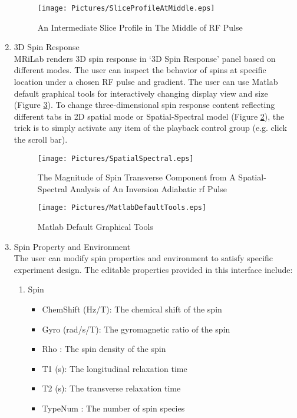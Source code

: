 \documentclass{book}%
\begin{document}
\begin{enumerate}
\begin{figure}[htbp]
	\centering
		\texttt{[image: Pictures/SliceProfileAtMiddle.eps]}
	\caption{An Intermediate Slice Profile in The Middle of RF Pulse}
	\label{fig:SliceProfileAtMiddle}
\end{figure}

	\item 3D Spin Response \\

MRiLab renders 3D spin response in `3D Spin Response' panel based on different modes. The user can inspect the behavior of spins at specific location under a chosen RF pulse and gradient. The user can use Matlab default graphical tools for interactively changing display view and size (Figure \ref{fig:MatlabDefaultTools}). To change three-dimensional spin response content reflecting different tabs in 2D spatial mode or Spatial-Spectral model (Figure \ref{fig:SpatialSpectral}), the trick is to simply activate any item of the playback control group (e.g. click the scroll bar).

\begin{figure}[htbp]
	\centering
		\texttt{[image: Pictures/SpatialSpectral.eps]}
	\caption{The Magnitude of Spin Transverse Component from A Spatial-Spectral Analysis of An Inversion Adiabatic rf Pulse}
	\label{fig:SpatialSpectral}
\end{figure}

\begin{figure}[htbp]
	\centering
		\texttt{[image: Pictures/MatlabDefaultTools.eps]}
	\caption{Matlab Default Graphical Tools}
	\label{fig:MatlabDefaultTools}
\end{figure}

\item Spin Property and Environment \\

The user can modify spin properties and environment to satisfy specific experiment design. The editable properties provided in this interface include:

\begin{enumerate}

\item Spin
\begin{itemize}
	\item ChemShift (Hz/T): The chemical shift of the spin
	\item Gyro (rad/s/T): The gyromagnetic ratio of the spin
	\item Rho : The spin density of the spin
	\item T1 (s): The longitudinal relaxation time
	\item T2 (s): The transverse relaxation time
	\item TypeNum : The number of spin species
\end{itemize}


\end{enumerate}
\end{enumerate}
\end{document}
